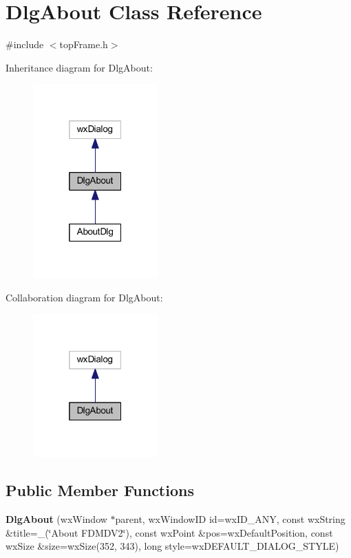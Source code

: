 \hypertarget{class_dlg_about}{\section{Dlg\-About Class Reference}
\label{class_dlg_about}
}


{\ttfamily \#include $<$top\-Frame.\-h$>$}



Inheritance diagram for Dlg\-About\-:\nopagebreak
\begin{figure}[H]
\begin{center}
\leavevmode
\includegraphics[width=136pt]{class_dlg_about__inherit__graph}
\end{center}
\end{figure}


Collaboration diagram for Dlg\-About\-:\nopagebreak
\begin{figure}[H]
\begin{center}
\leavevmode
\includegraphics[width=136pt]{class_dlg_about__coll__graph}
\end{center}
\end{figure}
\subsection*{Public Member Functions}
\begin{DoxyCompactItemize}
\item 
\hypertarget{class_dlg_about_a2d94603323a5f60eff69a92380fb9042}{{\bfseries Dlg\-About} (wx\-Window $\ast$parent, wx\-Window\-I\-D id=wx\-I\-D\-\_\-\-A\-N\-Y, const wx\-String \&title=\-\_\-(\char`\"{}About F\-D\-M\-D\-V2\char`\"{}), const wx\-Point \&pos=wx\-Default\-Position, const wx\-Size \&size=wx\-Size(352, 343), long style=wx\-D\-E\-F\-A\-U\-L\-T\-\_\-\-D\-I\-A\-L\-O\-G\-\_\-\-S\-T\-Y\-L\-E)}\label{class_dlg_about_a2d94603323a5f60eff69a92380fb9042}

\end{DoxyCompactItemize}
